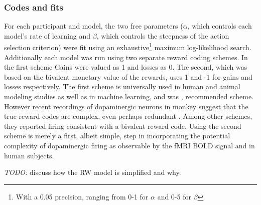 \documentclass[doc,12pt]{apa}        %
\begin{document}
\subsubsection{Codes and fits}
\label{subsub:codesandfits}
For each participant and model, the two free parameters ($\alpha$, which controls each model's rate of learning and $\beta$, which controls the steepness of the action selection criterion) were fit using an exhaustive\footnote{With a 0.05 precision, ranging from 0-1 for $\alpha$ and 0-5 for $\beta$} maximum log-likelihood search.  Additionally each model was run using two separate reward coding schemes.  In the first scheme Gains were valued as 1 and losses as 0.  The second, which was based on the bivalent monetary value of the rewards, uses 1 and -1 for gains and losses respectively.  The first scheme is universally used in human and animal modeling studies as well as in machine learning, and was , recommended scheme.  However recent recordings of dopaminergic neurons in monkey suggest that the true reward codes are complex, even perhaps redundant  .  Among other schemes, they reported firing consistent with a bivalent reward code.  Using the second scheme is merely a first, albeit simple, step in incorporating the potential complexity of dopaminergic firing as observable by the fMRI BOLD signal and in human subjects.

\emph{TODO:} discuss how the RW model is simplified and why.
\end{document}
